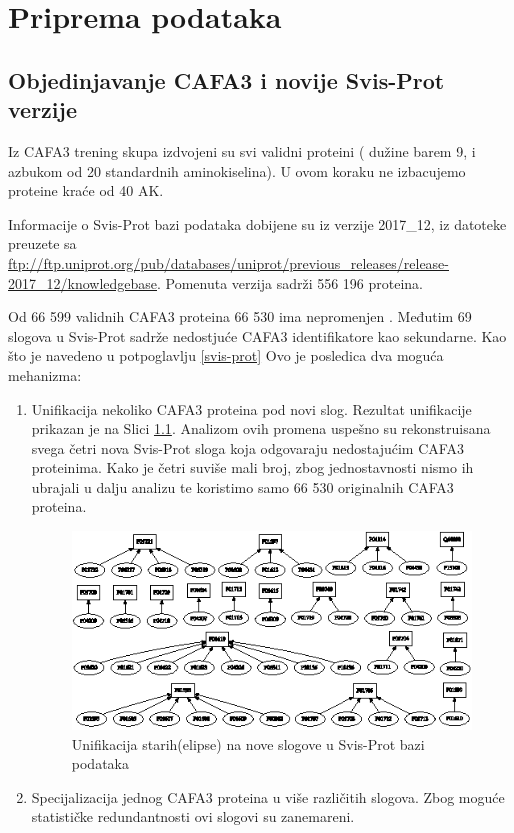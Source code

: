
\chapter{Priprema podataka} %

\label{Priprema_podataka} %

\section{Objedinjavanje CAFA3 i novije Svis-Prot verzije}

Iz CAFA3 trening skupa izdvojeni su svi validni proteini ( dužine barem 9, i
azbukom od 20 standardnih aminokiselina). U ovom koraku ne izbacujemo proteine
kraće od 40 AK.

Informacije o Svis-Prot bazi podataka dobijene su iz verzije 2017\_12, iz datoteke
 preuzete sa
\url{ftp://ftp.uniprot.org/pub/databases/uniprot/previous_releases/release-2017_12/knowledgebase}.
Pomenuta verzija sadrži 556 196 proteina. 

Od 66 599 validnih CAFA3 proteina 66 530 ima nepromenjen . Međutim  69 slogova u Svis-Prot sadrže nedostjuće CAFA3 identifikatore kao sekundarne.
Kao što je navedeno u potpoglavlju \ref{svis-prot} Ovo je posledica dva moguća mehanizma:

\begin{enumerate}
  \item Unifikacija nekoliko CAFA3 proteina pod novi slog.
    Rezultat unifikacije prikazan je na Slici \ref{fig:unifikacija_slogova}. Analizom
    ovih promena uspešno su rekonstruisana svega četri nova Svis-Prot sloga
    koja odgovaraju nedostajućim CAFA3 proteinima. Kako je četri
    suviše mali broj, zbog jednostavnosti nismo ih ubrajali u dalju analizu
    te koristimo samo 66 530 originalnih CAFA3 proteina.

  \begin{figure}[th]
  \centering
  \includegraphics[scale=2]{plots/unifikacija_slogova2.eps}
  \decoRule
  \caption{Unifikacija starih(elipse) na nove slogove u Svis-Prot bazi podataka}
  \label{fig:unifikacija_slogova}
  \end{figure}

  \item Specijalizacija jednog CAFA3 proteina u više različitih slogova.  Zbog moguće
    statističke redundantnosti ovi slogovi su zanemareni.
\end{enumerate}


